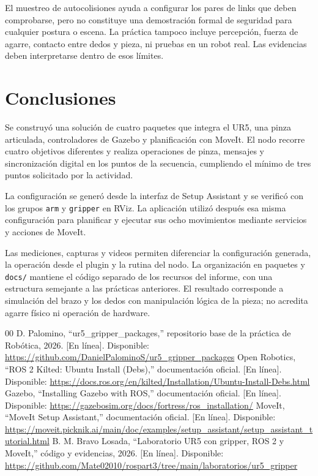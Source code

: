 \documentclass[conference]{IEEEtran}
\begin{document}
El muestreo de autocolisiones ayuda a configurar los pares de links
que deben comprobarse, pero no constituye una demostración formal
de seguridad para cualquier postura o escena. La práctica tampoco
incluye percepción, fuerza de agarre, contacto entre dedos y pieza,
ni pruebas en un robot real. Las evidencias deben interpretarse
dentro de esos límites.

\section{Conclusiones}
Se construyó una solución de cuatro paquetes que integra el UR5,
una pinza articulada, controladores de Gazebo y planificación con
MoveIt. El nodo recorre cuatro objetivos diferentes y realiza
operaciones de pinza, mensajes y sincronización digital en los
puntos de la secuencia, cumpliendo el mínimo de tres puntos
solicitado por la actividad.

La configuración se generó desde la interfaz de Setup Assistant
y se verificó con los grupos \texttt{arm} y \texttt{gripper} en RViz.
La aplicación utilizó después esa misma configuración para
planificar y ejecutar sus ocho movimientos mediante servicios
y acciones de MoveIt.

Las mediciones, capturas y videos permiten diferenciar la
configuración generada, la operación desde el plugin y la rutina
del nodo. La organización en paquetes y \texttt{docs/} mantiene
el código separado de los recursos del informe, con una estructura
semejante a las prácticas anteriores. El resultado corresponde
a simulación del brazo y los dedos con manipulación lógica de
la pieza; no acredita agarre físico ni operación de hardware.

\newpage
\begin{thebibliography}{00}
 D. Palomino, “ur5\_gripper\_packages,” repositorio
base de la práctica de Robótica, 2026. [En línea]. Disponible:
\url{https://github.com/DanielPalominoS/ur5_gripper_packages}
 Open Robotics, “ROS 2 Kilted: Ubuntu Install (Debs),”
documentación oficial. [En línea]. Disponible:
\url{https://docs.ros.org/en/kilted/Installation/Ubuntu-Install-Debs.html}
 Gazebo, “Installing Gazebo with ROS,” documentación
oficial. [En línea]. Disponible:
\url{https://gazebosim.org/docs/fortress/ros_installation/}
 MoveIt, “MoveIt Setup Assistant,” documentación
oficial. [En línea]. Disponible:
\url{https://moveit.picknik.ai/main/doc/examples/setup_assistant/setup_assistant_tutorial.html}
 B. M. Bravo Losada, “Laboratorio UR5 con gripper,
ROS 2 y MoveIt,” código y evidencias, 2026. [En línea]. Disponible:
\url{https://github.com/Mate02010/rospart3/tree/main/laboratorios/ur5_gripper}
\end{thebibliography}
\end{document}
